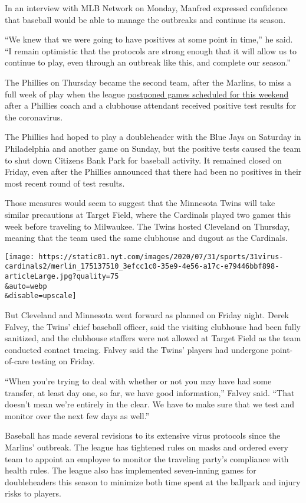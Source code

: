 In an interview with MLB Network on Monday, Manfred expressed confidence
that baseball would be able to manage the outbreaks and continue its
season.

``We knew that we were going to have positives at some point in time,''
he said. ``I remain optimistic that the protocols are strong enough that
it will allow us to continue to play, even through an outbreak like
this, and complete our season.''

The Phillies on Thursday became the second team, after the Marlins, to
miss a full week of play when the league
\href{https://www.nytimes.com/2020/07/30/sports/baseball/phillies-blue-jays-postponed-coronavirus.html}{postponed
games scheduled for this weekend} after a Phillies coach and a clubhouse
attendant received positive test results for the coronavirus.

The Phillies had hoped to play a doubleheader with the Blue Jays on
Saturday in Philadelphia and another game on Sunday, but the positive
tests caused the team to shut down Citizens Bank Park for baseball
activity. It remained closed on Friday, even after the Phillies
announced that there had been no positives in their most recent round of
test results.

Those measures would seem to suggest that the Minnesota Twins will take
similar precautions at Target Field, where the Cardinals played two
games this week before traveling to Milwaukee. The Twins hosted
Cleveland on Thursday, meaning that the team used the same clubhouse and
dugout as the Cardinals.

\texttt{[image: https://static01.nyt.com/images/2020/07/31/sports/31virus-cardinals2/merlin\_175137510\_3efcc1c0-35e9-4e56-a17c-e79446bbf898-articleLarge.jpg?quality=75\\\&auto=webp\\\&disable=upscale]}

But Cleveland and Minnesota went forward as planned on Friday night.
Derek Falvey, the Twins' chief baseball officer, said the visiting
clubhouse had been fully sanitized, and the clubhouse staffers were not
allowed at Target Field as the team conducted contact tracing. Falvey
said the Twins' players had undergone point-of-care testing on Friday.

``When you're trying to deal with whether or not you may have had some
transfer, at least day one, so far, we have good information,'' Falvey
said. ``That doesn't mean we're entirely in the clear. We have to make
sure that we test and monitor over the next few days as well.''

Baseball has made several revisions to its extensive virus protocols
since the Marlins' outbreak. The league has tightened rules on masks and
ordered every team to appoint an employee to monitor the traveling
party's compliance with health rules. The league also has implemented
seven-inning games for doubleheaders this season to minimize both time
spent at the ballpark and injury risks to players.

